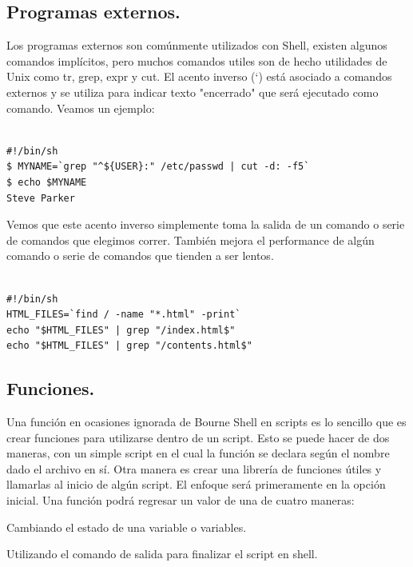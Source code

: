 \documentclass{article} %
\begin{document}
\subsection{Programas externos.}

Los programas externos son comúnmente utilizados con Shell, existen algunos comandos implícitos, pero muchos comandos utiles son de hecho utilidades de Unix como tr, grep, expr y cut. El acento inverso (`) está asociado a comandos externos y se utiliza para indicar texto "encerrado" que será ejecutado como comando. Veamos un ejemplo:

\begin{verbatim} 

#!/bin/sh
$ MYNAME=`grep "^${USER}:" /etc/passwd | cut -d: -f5`
$ echo $MYNAME
Steve Parker

\end{verbatim}

Vemos que este acento inverso simplemente toma la salida de un comando o serie de comandos que elegimos correr. También mejora el performance de algún comando o serie de comandos que tienden a ser lentos.

\begin{verbatim} 

#!/bin/sh
HTML_FILES=`find / -name "*.html" -print`
echo "$HTML_FILES" | grep "/index.html$"
echo "$HTML_FILES" | grep "/contents.html$"

\end{verbatim}

\subsection{Funciones.}

Una función en ocasiones ignorada de Bourne Shell en scripts es lo sencillo que es crear funciones para utilizarse dentro de un script. Esto se puede hacer de dos maneras, con un simple script en el cual la función se declara según el nombre dado el archivo en sí. Otra manera es crear una librería de funciones útiles y llamarlas al inicio de algún script. El enfoque será primeramente en la opción inicial. Una función podrá regresar un valor de una de cuatro maneras:

\vspace{0.5 cm}

Cambiando el estado de una variable o variables.

\vspace{0.5 cm}

Utilizando el comando de salida para finalizar el script en shell.
\end{document}
